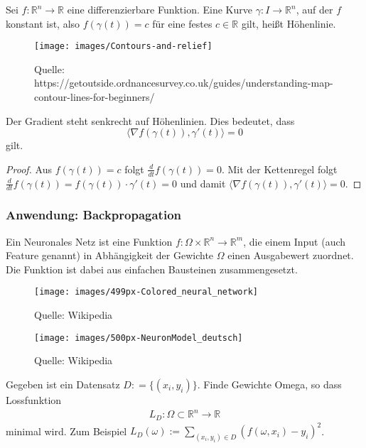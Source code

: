 \begin{Definition}
Sei  $f: \mathbb{R}^n \to \mathbb{R}$  eine differenzierbare Funktion. Eine Kurve $\gamma : I \to \mathbb{R}^n$, auf der $f$ konstant ist, also 
$f(\gamma(t)) = c$ für eine festes $c \in \mathbb{R}$ gilt, heißt Höhenlinie.
\end{Definition}

\begin{figure}[H]
      \centering
    \texttt{[image: images/Contours-and-relief]}
      \caption{Quelle: https://getoutside.ordnancesurvey.co.uk/guides/understanding-map-contour-lines-for-beginners/}
\end{figure}


\begin{Bemerkung}
Der Gradient steht senkrecht auf  Höhenlinien. Dies bedeutet, dass $$ \bigl \langle \nabla f(\gamma(t)), \gamma'(t) \bigr \rangle = 0$$ gilt. 
\end{Bemerkung}
\begin{proof}
Aus $f(\gamma(t)) = c$ folgt $\frac{d}{dt} f(\gamma(t)) = 0$. Mit der Kettenregel folgt $\frac{d}{dt} f(\gamma(t)) =  f(\gamma(t)) \cdot \gamma'(t) = 0$ und damit
$ \bigl \langle \nabla f(\gamma(t)), \gamma'(t) \bigr \rangle = 0$.
\end{proof}

\subsubsection*{Anwendung: Backpropagation}
Ein Neuronales Netz ist eine Funktion $f : \Omega \times \mathbb{R}^n \to \mathbb{R}^m$, die einem Input (auch Feature genannt) in Abhängigkeit der Gewichte $\Omega$
einen Ausgabewert zuordnet. Die Funktion ist dabei aus einfachen Bausteinen zusammengesetzt.

\begin{figure}[H]
      \centering
    \texttt{[image: images/499px-Colored\_neural\_network]}
      \caption{Quelle: Wikipedia}
    \texttt{[image: images/500px-NeuronModel\_deutsch]}
      \caption{Quelle: Wikipedia}
\end{figure}


Gegeben ist ein  Datensatz $D : = \{ (x_i, y_i) \}$. Finde Gewichte Omega, so dass Lossfunktion
\begin{align*}
L_D  : \Omega \subset \mathbb{R}^n \to \mathbb{R} 
\end{align*}
minimal wird. Zum Beispiel $L_D(\omega) := \sum_{(x_i,y_i) \in D} (f(\omega, x_i) - y_i)^2$.

